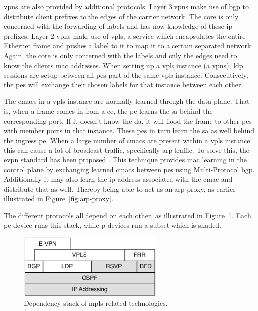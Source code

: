 \acp{vpn} are also provided by additional protocols. Layer 3 \acp{vpn} make use of \ac{bgp} to distribute client prefixes to the edges of the carrier network. The core is only concerned with the forwarding of labels and has now knowledge of these \acs{ip} prefixes. Layer 2 \acp{vpn} make use of \ac{vpls}, a service which encapsulates the entire Ethernet frame and pushes a label to it to map it to a certain separated network. Again, the core is only concerned with the labels and only the edges need to know the clients \acs{mac} addresses. When setting up a \ac{vpls} instance (a \acp{vpn}), \ac{ldp} sessions are setup between all \acp{pe} part of the same \ac{vpls} instance. Consecutively, the \acp{pe} will exchange their chosen labels for that instance between each other.

The \acp{cmac} in a \ac{vpls} instance are normally learned through the data plane. That is, when a frame comes in from a \ac{ce}, the \ac{pe} learns the \ac{sa} behind the corresponding port. If it doesn't know the \ac{da}, it will flood the frame to other \acp{pe} with member ports in that instance. These \acp{pe} in turn learn the \ac{sa} as well behind the ingress \ac{pe}. When a large number of \acp{cmac} are present within a \ac{vpls} instance this can cause a lot of broadcast traffic, specifically \ac{arp} traffic. To solve this, the \ac{evpn} standard has been proposed \cite{evpn}. This technique provides \ac{mac} learning in the control plane by exchanging learned \acp{cmac} between \acp{pe} using Multi-Protocol \ac{bgp}. Additionally it may also learn the \ac{ip} address associated with the \ac{cmac} and distribute that as well. Thereby being able to act as an \ac{arp} proxy, as earlier illustrated in Figure~\ref{fig:arp-proxy}.

The different protocols all depend on each other, as illustrated in Figure~\ref{fig:mpls-stack}. Each \ac{pe} device runs this stack, while \ac{p} devices run a subset which is shaded. 

\begin{figure}[!h]
	\centering
	\includegraphics[width=7cm]{./includes/mpls-stack.pdf}
	\caption{Dependency stack of \ac{mpls}-related technologies.}
	\label{fig:mpls-stack}
\end{figure} 

